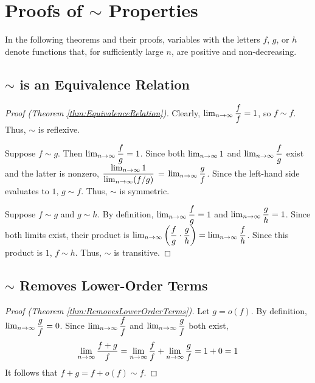 \appendix
\appendixpage

\section{Proofs of $\sim$ Properties}

{\HdrNote} In the following theorems and their proofs, variables with the letters $f$, $g$, or $h$ denote functions that, for sufficiently large $n$, are positive and non-decreasing.

\subsection{$\sim$ is an Equivalence Relation}

\begin{proof}[Proof (Theorem \ref{thm:EquivalenceRelation})]
	Clearly, $\lim_{n \to \infty} \dfrac{f}{f} = 1$, so $f \sim f$. Thus, $\sim$ is reflexive.
	
	Suppose $f \sim g$. Then $\lim_{n \to \infty} \dfrac{f}{g} = 1$. Since both $\lim_{n \to \infty} 1$ and $\lim_{n \to \infty} \dfrac{f}{g}$ exist and the latter is nonzero, $\dfrac{\lim_{n \to \infty} 1}{\lim_{n \to \infty} (f / g)}$ = $\lim_{n \to \infty} \dfrac{g}{f}$. Since the left-hand side evaluates to $1$, $g \sim f$. Thus, $\sim$ is symmetric.
	
	Suppose $f \sim g$ and $g \sim h$. By definition, $\lim_{n \to \infty} \dfrac{f}{g} = 1$ and $\lim_{n \to \infty} \dfrac{g}{h} = 1$. Since both limits exist, their product is $\lim_{n \to \infty} \left( \dfrac{f}{g} \cdot \dfrac{g}{h} \right) = \lim_{n \to \infty} \dfrac{f}{h}$. Since this product is $1$, $f \sim h$. Thus, $\sim$ is transitive.
\end{proof}

\subsection{$\sim$ Removes Lower-Order Terms}

\begin{proof}[Proof (Theorem \ref{thm:RemovesLowerOrderTerms})]
	Let $g = o(f)$. By definition, $\lim_{n \to \infty} \dfrac{g}{f} = 0$. Since $\lim_{n \to \infty} \dfrac{f}{f}$ and $\lim_{n \to \infty} \dfrac{g}{f}$ both exist,
	\begin{align*}
	\lim_{n \to \infty} \dfrac{f + g}{f} = \lim_{n \to \infty} \dfrac{f}{f} + \lim_{n \to \infty} \dfrac{g}{f} = 1 + 0 = 1
	\end{align*}
	It follows that $f + g = f + o(f) \sim f$.
\end{proof}

